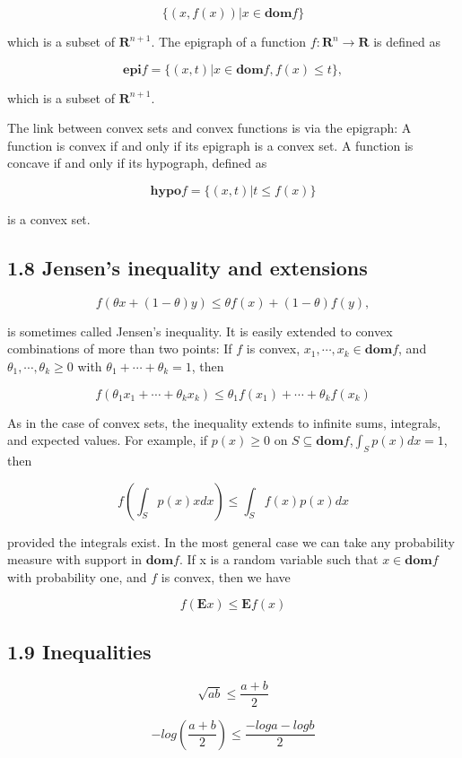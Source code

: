 \documentclass{article}
\begin{document}
\[
    \{(x, f(x))|x \in \mathbf{dom}f\}
\]

which is a subset of $\mathbf{R}^{n+1}$. The epigraph of a function $f : \mathbf{R}^n \rightarrow \mathbf{R}$ is defined as

\[
\mathbf{epi} f=\{(x, t) | x \in \mathbf{dom}f, f(x) \le t\},
\]

which is a subset of $\mathbf{R}^{n+1}$.

The link between convex sets and convex functions is via the epigraph: A
function is convex if and only if its epigraph is a convex set. A function is concave
if and only if its hypograph, defined as

\[
    \mathbf{hypo} f=\{(x, t)|t\le f(x)\}
\]

is a convex set.

\subsection*{1.8 Jensen's inequality and extensions}

\[
    f(\theta x + (1-\theta)y) \le \theta f(x)+(1-\theta)f(y),
\]

is sometimes called Jensen's inequality. It is easily extended to convex combinations
of more than two points: If $f$ is convex, $x_1,\cdots, x_k \in \mathbf{dom}f$, and $\theta_1,\cdots, \theta_k \ge 0$
with $\theta_1+\cdots+\theta_k=1$, then

\[
f(\theta_1x_1+\cdots+\theta_kx_k)\le \theta_1f(x_1)+\cdots+\theta_kf(x_k)
\]

As in the case of convex sets, the inequality extends to infinite sums, integrals, and
expected values. For example, if $p(x) \ge 0$ on $S \subseteq \mathbf{dom}f$,$\int_S p(x)dx=1$, then

\[
f(\int_Sp(x)xdx)\le\int_S f(x)p(x)dx    
\]

provided the integrals exist. In the most general case we can take any probability
measure with support in $\mathbf{dom}f$. If x is a random variable such that $x \in \mathbf{dom}f$
with probability one, and $f$ is convex, then we have

\[
    f(\mathbf{E}x)\le \mathbf{E}f(x)    
\]

\subsection*{1.9 Inequalities}

\[
\sqrt{ab}\le \frac{a+b}{2}    
\]

\[
    -log(\frac{a+b}{2})\le\frac{-log a-logb}{2}
\]
\end{document}
